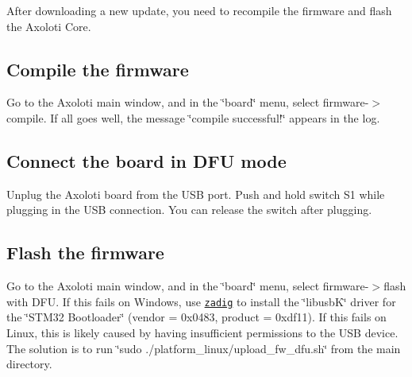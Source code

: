 After downloading a new update, you need to recompile the firmware and flash the Axoloti Core.

\subsection*{Compile the firmware}

Go to the Axoloti main window, and in the \char`\"{}board\char`\"{} menu, select firmware-\/$>$compile. If all goes well, the message \char`\"{}compile successful!\char`\"{} appears in the log. \subsection*{Connect the board in D\+FU mode}

Unplug the Axoloti board from the U\+SB port. Push and hold switch S1 while plugging in the U\+SB connection. You can release the switch after plugging. \subsection*{Flash the firmware}

Go to the Axoloti main window, and in the \char`\"{}board\char`\"{} menu, select firmware-\/$>$flash with D\+FU. If this fails on Windows, use \href{http://zadig.akeo.ie/}{\tt zadig} to install the \char`\"{}libusb\+K\char`\"{} driver for the \char`\"{}\+S\+T\+M32 Bootloader\char`\"{} (vendor = 0x0483, product = 0xdf11). If this fails on Linux, this is likely caused by having insufficient permissions to the U\+SB device. The solution is to run \char`\"{}sudo ./platform\+\_\+linux/upload\+\_\+fw\+\_\+dfu.\+sh\char`\"{} from the main directory. 